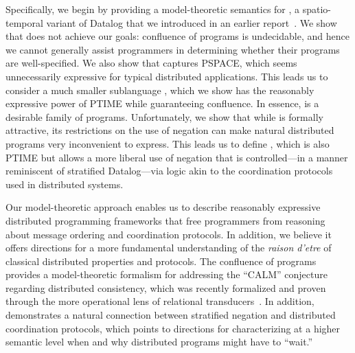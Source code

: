 Specifically, we begin by providing a model-theoretic semantics for \lang, a
spatio-temporal variant of Datalog that we introduced in an earlier
report~\cite{dedalus}.  We show that \lang does not achieve our goals:
confluence of \lang programs is undecidable, and hence we cannot generally
assist \lang programmers in determining whether their programs are
well-specified.  We also show that \lang captures PSPACE, which seems
unnecessarily expressive for typical distributed applications.  This leads us to
consider a much smaller sublanguage \slang, which we show has the reasonably
expressive power of PTIME while guaranteeing confluence. In essence, \slang is a
desirable family of \lang programs.  Unfortunately, we show that while \slang is
formally attractive, its restrictions on the use of negation can make natural
distributed programs very inconvenient to express.  This leads us to define
\plang, which is also PTIME but allows a more liberal use of negation that is
controlled---in a manner reminiscent of stratified Datalog---via logic akin to
the coordination protocols used in distributed systems.


Our model-theoretic approach enables us to describe reasonably expressive distributed programming frameworks that free programmers from reasoning about message ordering and coordination protocols.  In addition, we believe it offers directions for a more fundamental understanding of the {\em raison d'etre} of classical distributed properties and protocols.
The confluence of \slang programs provides a model-theoretic formalism for addressing the ``CALM'' conjecture~\cite{declarative-imperative} regarding distributed consistency, which was recently formalized and proven through the more operational lens of relational transducers~\cite{relational-transducers}.  In addition, \plang demonstrates a natural connection between stratified negation and distributed coordination protocols, which points to directions for characterizing at a higher semantic level when and why distributed programs might have to ``wait.''
